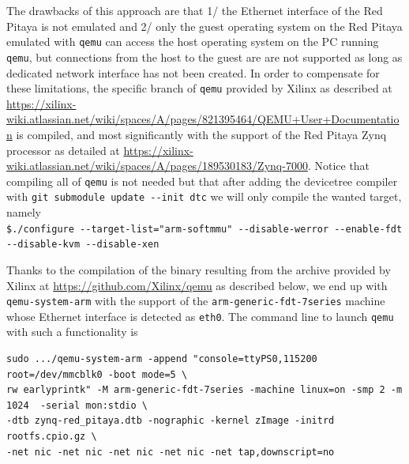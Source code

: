 \documentclass{article}
\begin{document}
{The drawbacks of this approach are that 1/ the Ethernet interface of the Red Pitaya is not
emulated and 2/ only the guest operating system on the Red Pitaya emulated with 
{\tt qemu} can access the host operating system on the PC running {\tt qemu}, but connections
from the host to the guest are are not supported as long as dedicated network interface has
not been created. In order to compensate for these limitations, the specific branch of
{\tt qemu} provided by Xilinx as described at 
\url{https://xilinx-wiki.atlassian.net/wiki/spaces/A/pages/821395464/QEMU+User+Documentation}
is compiled, and most significantly with the support of the Red Pitaya Zynq processor as
detailed at \url{https://xilinx-wiki.atlassian.net/wiki/spaces/A/pages/189530183/Zynq-7000}.
Notice that compiling all of {\tt qemu} is not needed but that after adding the devicetree
compiler with \verb~git submodule update --init dtc~ we will only compile the wanted target,
namely \\
\verb~$./configure --target-list="arm-softmmu" --disable-werror --enable-fdt --disable-kvm --disable-xen~

Thanks to the compilation of the binary resulting from the archive provided by Xilinx at
\url{https://github.com/Xilinx/qemu} as described below, we end up with 
{\tt qemu-system-arm} with the support of the {\tt arm-generic-fdt-7series}
machine whose Ethernet interface is detected as {\tt eth0}. The command line to launch 
{\tt qemu} with such a functionality is
\begin{verbatim}
sudo .../qemu-system-arm -append "console=ttyPS0,115200 root=/dev/mmcblk0 -boot mode=5 \
rw earlyprintk" -M arm-generic-fdt-7series -machine linux=on -smp 2 -m 1024  -serial mon:stdio \
-dtb zynq-red_pitaya.dtb -nographic -kernel zImage -initrd rootfs.cpio.gz \
-net nic -net nic -net nic -net nic -net tap,downscript=no
\end{verbatim}

}
\end{document}
